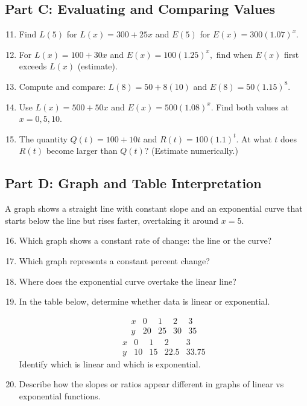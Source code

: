 \documentclass[14pt]{extarticle}
\begin{document}
\subsection*{Part C: Evaluating and Comparing Values}
\begin{enumerate}
  \setcounter{enumi}{10}
  \item Find \(L(5)\) for \(L(x) = 300 + 25x\) and \(E(5)\) for \(E(x) = 300(1.07)^x.\)
  \item For \(L(x) = 100 + 30x\) and \(E(x) = 100(1.25)^x,\) find when \(E(x)\) first exceeds \(L(x)\) (estimate).
  \item Compute and compare:  
  \(L(8) = 50 + 8(10)\) and \(E(8) = 50(1.15)^8.\)
  \item Use \(L(x) = 500 + 50x\) and \(E(x) = 500(1.08)^x.\)  
  Find both values at \(x = 0, 5, 10.\)
  \item The quantity \(Q(t) = 100 + 10t\) and \(R(t) = 100(1.1)^t.\)  
  At what \(t\) does \(R(t)\) become larger than \(Q(t)\)? (Estimate numerically.)
\end{enumerate}

\subsection*{Part D: Graph and Table Interpretation}
A graph shows a straight line with constant slope and an exponential curve that starts below the line but rises faster, overtaking it around \(x = 5\).


\begin{enumerate}
  \setcounter{enumi}{15}
  \item Which graph shows a constant rate of change: the line or the curve?
  \item Which graph represents a constant percent change?
  \item Where does the exponential curve overtake the linear line?
  \item In the table below, determine whether data is linear or exponential.  

  \[
  \begin{array}{c|cccc}
  x & 0 & 1 & 2 & 3 \\ \hline
  y & 20 & 25 & 30 & 35
  \end{array}
  \]
  \[
  \begin{array}{c|cccc}
  x & 0 & 1 & 2 & 3 \\ \hline
  y & 10 & 15 & 22.5 & 33.75
  \end{array}
  \]
  Identify which is linear and which is exponential.
  \item Describe how the slopes or ratios appear different in graphs of linear vs exponential functions.
\end{enumerate}
\end{document}
